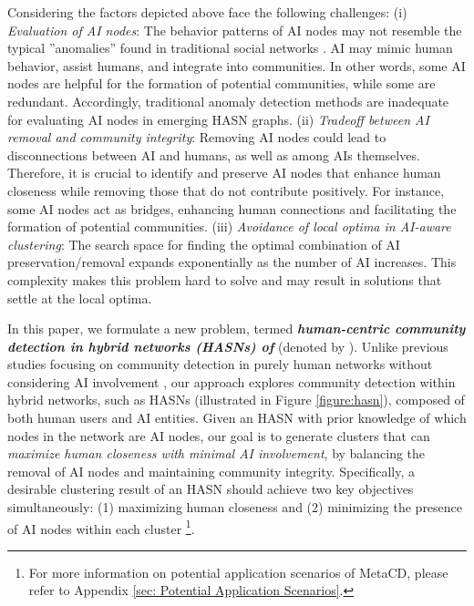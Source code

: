 Considering the factors depicted above face the following challenges: (i) \textit{Evaluation of AI nodes}: The behavior patterns of AI nodes may not resemble the typical ”anomalies” found in traditional social networks \cite{ma2021comprehensive}. AI may mimic human behavior, assist humans, and integrate into communities. In other words, some AI nodes are helpful for the formation of potential communities, while some are redundant. Accordingly, traditional anomaly detection methods are inadequate for evaluating AI nodes in emerging HASN graphs. (ii) \textit{Tradeoff between AI removal and community integrity}: Removing AI nodes could lead to disconnections between AI and humans, as well as among AIs themselves. Therefore, it is crucial to identify and preserve AI nodes that enhance human closeness while removing those that do not contribute positively. For instance, some AI nodes act as bridges, enhancing human connections and facilitating the formation of potential communities. (iii) \textit{Avoidance of local optima in AI-aware clustering}: The search space for finding the optimal combination of AI preservation/removal expands exponentially as the number of AI increases. This complexity makes this problem hard to solve and may result in solutions that settle at the local optima.

In this paper, we formulate a new problem, termed \textbf{\textit{human-centric community detection in hybrid networks (HASNs) of \XR}} (denoted by \problem). Unlike previous studies focusing on community detection in purely human networks without considering AI involvement \cite{su2022comprehensive}\cite{jin2021survey}, our approach explores community detection within hybrid networks, such as HASNs (illustrated in Figure \ref{figure:hasn}), composed of both human users and AI entities.  Given an HASN with prior knowledge of which nodes in the network are AI nodes, our goal is to generate clusters that can \textit{maximize human closeness with minimal AI involvement}, by balancing the removal of AI nodes and maintaining community integrity. Specifically, a desirable clustering result of an HASN should achieve two key objectives simultaneously: (1) maximizing human closeness and (2) minimizing the presence of AI nodes within each cluster \footnote{For more information on potential application scenarios of MetaCD, please refer to Appendix \ref{sec: Potential Application Scenarios}.}.

